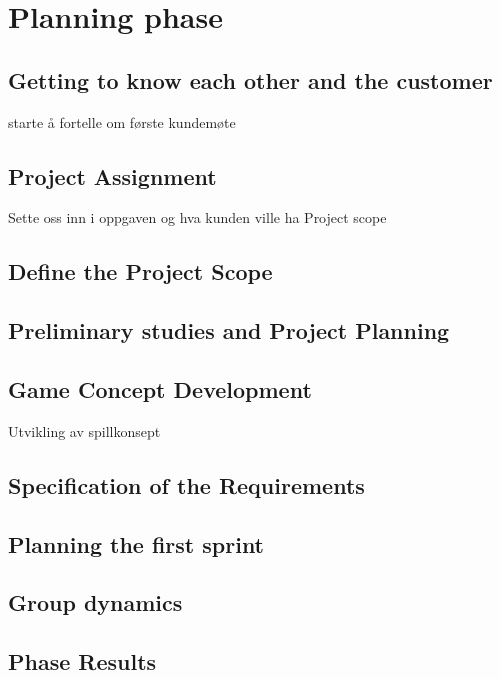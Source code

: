 \section{Planning phase}

\subsection{Getting to know each other and the customer}
	starte å fortelle om første kundemøte

\subsection{Project Assignment}
	Sette oss inn i oppgaven og hva kunden ville ha
	Project scope

\subsection{Define the Project Scope}

\subsection{Preliminary studies and Project Planning}

\subsection{Game Concept Development}
	Utvikling av spillkonsept

\subsection{Specification of the Requirements}

\subsection{Planning the first sprint}

\subsection{Group dynamics}

\subsection{Phase Results}
